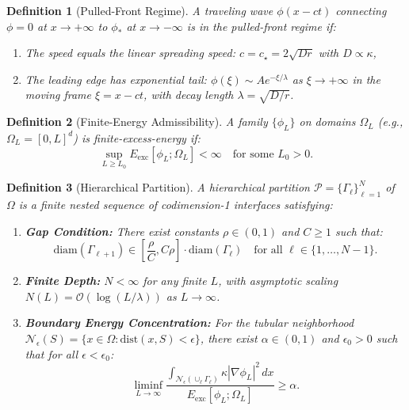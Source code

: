 \documentclass{article}
\newtheorem{definition}{Definition}
\begin{document}
\begin{definition}[Pulled-Front Regime]
A traveling wave $\phi(x - ct)$ connecting $\phi = 0$ at $x \to +\infty$ to $\phi_\ast$ at $x \to -\infty$ is in the \emph{pulled-front regime} if:
\begin{enumerate}[noitemsep]
\item The speed equals the linear spreading speed: $c = c_\star = 2\sqrt{D r}$ with $D \propto \kappa$,
\item The leading edge has exponential tail: $\phi(\xi) \sim A e^{-\xi/\lambda}$ as $\xi \to +\infty$ in the moving frame $\xi = x - ct$, with decay length $\lambda = \sqrt{D/r}$.
\end{enumerate}
\end{definition}

\begin{definition}[Finite-Energy Admissibility]
A family $\{\phi_L\}$ on domains $\Omega_L$ (e.g., $\Omega_L = [0,L]^d$) is \emph{finite-excess-energy} if:
\begin{equation}
\sup_{L \geq L_0} E_{\text{exc}}[\phi_L; \Omega_L] < \infty \quad \text{for some } L_0 > 0.
\end{equation}
\end{definition}

\begin{definition}[Hierarchical Partition]
A \emph{hierarchical partition} $\mathcal{P} = \{\Gamma_\ell\}_{\ell=1}^N$ of $\Omega$ is a finite nested sequence of codimension-1 interfaces satisfying:
\begin{enumerate}[noitemsep]
\item \textbf{Gap Condition:} There exist constants $\rho \in (0,1)$ and $C \geq 1$ such that:
\begin{equation}
\text{diam}(\Gamma_{\ell+1}) \in \left[\frac{\rho}{C}, C\rho\right] \cdot \text{diam}(\Gamma_\ell) \quad \text{for all } \ell \in \{1, \ldots, N-1\}.
\end{equation}
\item \textbf{Finite Depth:} $N < \infty$ for any finite $L$, with asymptotic scaling $N(L) = \mathcal{O}(\log(L/\lambda))$ as $L \to \infty$.
\item \textbf{Boundary Energy Concentration:} For the tubular neighborhood $\mathcal{N}_\epsilon(S) = \{x \in \Omega : \text{dist}(x, S) < \epsilon\}$, there exist $\alpha \in (0,1)$ and $\epsilon_0 > 0$ such that for all $\epsilon < \epsilon_0$:
\begin{equation}
\liminf_{L \to \infty} \frac{\int_{\mathcal{N}_\epsilon(\cup_\ell \Gamma_\ell)} \kappa |\nabla\phi_L|^2\, dx}{E_{\text{exc}}[\phi_L; \Omega_L]} \geq \alpha.
\end{equation}
\end{enumerate}
\end{definition}
\end{document}
